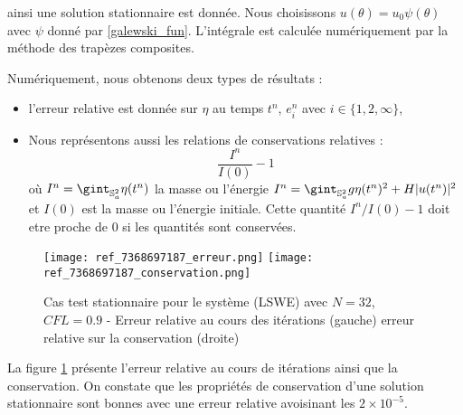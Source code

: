 ainsi une solution stationnaire est donnée. Nous choisissons $u(\theta) = u_0 \psi( \theta )$ avec $\psi$ donné par \eqref{galewski_fun}. L'intégrale est calculée numériquement par la méthode des trapèzes composites.

Numériquement, nous obtenons deux types de résultats :
\begin{itemize}
\item  l'erreur relative est donnée sur $\eta$ au temps $t^n$, $e_i^n$ avec $i \in \lbrace 1, 2, \infty \rbrace$,
\item Nous représentons aussi les relations de conservations relatives :
\begin{equation}
\dfrac{I^n}{I(0)}-1
\end{equation}
où  $I^n = \gint_{\mathbb{S}_a^2} \eta (t^n)$ la masse ou l'énergie $I^n = \gint_{\mathbb{S}_a^2} g \eta (t^n)^2 + H |u(t^n) |^2$ et $I(0)$ est la masse ou l'énergie initiale. Cette quantité $I^n/I(0)-1$ doit etre proche de $0$ si les quantités sont conservées.
\end{itemize} 

\begin{figure}[ht!]
\begin{center}
\texttt{[image: ref\_7368697187\_erreur.png]}
\texttt{[image: ref\_7368697187\_conservation.png]}
\caption{Cas test stationnaire pour le système (LSWE) avec $N=32$, $CFL=0.9$ - Erreur relative au cours des itérations (gauche) erreur relative sur la conservation (droite)}
\label{fig:err and cons lswe2}
\end{center}
\end{figure}

La figure \ref{fig:err and cons lswe2} présente l'erreur relative au cours de itérations ainsi que la conservation. On constate que les propriétés de conservation d'une solution stationnaire sont bonnes avec une erreur relative avoisinant les $2 \times 10^{-5}$. 









































